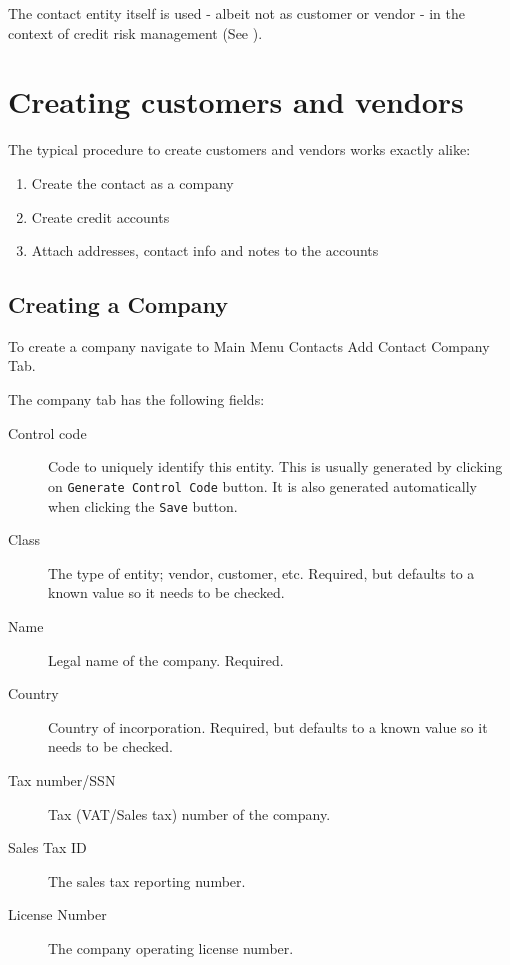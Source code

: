 The contact entity itself is used - albeit not as customer or vendor - in the context of
credit risk management (See ).

\section{Creating customers and vendors}
\label{sec-business-processes-creating-customers-and-vendors}

The typical procedure to create customers and vendors works exactly alike:

\begin{enumerate}
\item Create the \gls{contact} as a company
\item Create \glspl{credit account}
\item Attach addresses, contact info and notes to the accounts
\end{enumerate}

\subsection{Creating a Company}
\label{subsec-business-processes-customer-creating-company}

To create a company navigate to Main Menu \ma Contacts \ma Add Contact \ma Company Tab.

The company tab has the following fields:

\begin{description}
\item [Control code] Code to uniquely identify this entity.  This is usually generated by clicking on \texttt{Generate Control Code} button.  It is also generated automatically when clicking the \texttt{Save} button.
\item [Class] The type of entity; \gls{vendor}, \gls{customer}, etc. Required, but defaults to a known value so it needs to be checked.
\item [Name] Legal name of the company. Required.
\item [Country] Country of incorporation. Required, but defaults to a known value so it needs to be checked.
\item [Tax number/SSN] Tax (VAT/Sales tax) number of the company.
\item [Sales Tax ID] The sales tax reporting number.
\item [License Number] The company operating license number.
\end{description}

